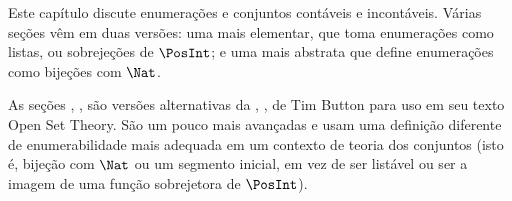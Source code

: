 \documentclass[../../../include/open-logic-chapter]{subfiles}
\begin{document}

\begin{editorial}
Este capítulo discute enumerações e conjuntos contáveis e incontáveis.
Várias seções vêm em duas versões: uma mais elementar, que
toma enumerações como listas, ou sobrejeções de $\PosInt$; e uma
mais abstrata que define enumerações como bijeções com $\Nat$.
\end{editorial}











\begin{editorial}
As seções ,
,  são
versões alternativas da ,
,  de Tim
Button para uso em seu texto Open Set Theory. São um pouco mais
avançadas e usam uma definição diferente de enumerabilidade mais
adequada em um contexto de teoria dos conjuntos (isto é, bijeção com $\Nat$ ou um
segmento inicial, em vez de ser listável ou ser a imagem de uma
função sobrejetora de $\PosInt$).
\end{editorial}


\OLEndChapterHook
\end{document}
